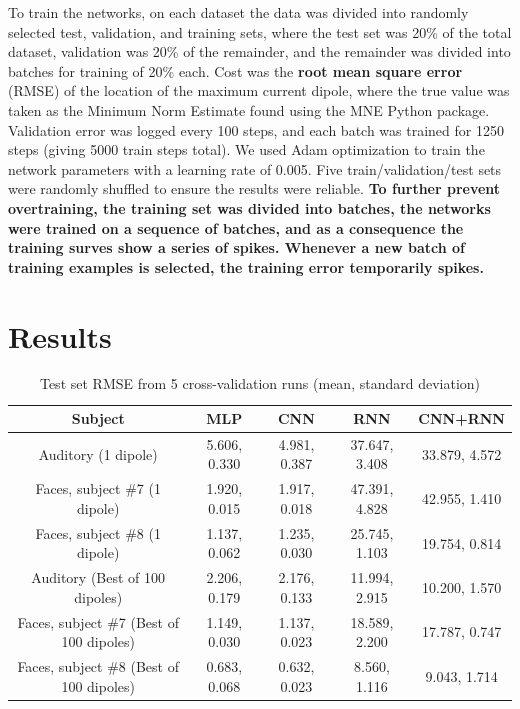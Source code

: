 \documentclass[journal,12pt,onecolumn,draftclsnofoot,]{IEEEtran}
\begin{document}
To train the networks, on each dataset the data was divided into randomly selected test, validation, and training sets, where the test set was 20\% of the total dataset, validation was 20\% of the remainder, and the remainder was divided into batches for training of 20\% each. Cost was the \textbf{root mean square error} (RMSE) of the location of the maximum current dipole, where the true value was taken as the Minimum Norm Estimate found using the MNE Python package. Validation error was logged every 100 steps, and each batch was trained for 1250 steps (giving 5000 train steps total). We used Adam optimization to train the network parameters \cite{kingma2014adam} with a learning rate of 0.005. Five train/validation/test sets were randomly shuffled to ensure the results were reliable. \textbf{To further prevent overtraining, the training set was divided into batches, the networks were trained on a sequence of batches, and as a consequence the training surves show a series of spikes. Whenever a new batch of training examples is selected, the training error temporarily spikes.}

\section{Results}

\begin{table}[h!]
  \centering
  \begin{tabular}{c||c|c|c|c}
    \hline
    Subject & MLP & CNN & RNN & CNN+RNN\\
    \hline
    \hline
    Auditory (1 dipole) & 5.606, 0.330 & 4.981, 0.387 & 37.647, 3.408 & 33.879, 4.572 \\
    \hline
    Faces, subject \#7 (1 dipole) &  1.920, 0.015 & 1.917, 0.018 & 47.391, 4.828 & 42.955, 1.410 \\
    \hline
    Faces, subject \#8 (1 dipole) &  1.137, 0.062 & 1.235, 0.030 & 25.745, 1.103 & 19.754, 0.814 \\
    \hline
    Auditory (Best of 100 dipoles) & 2.206, 0.179 & 2.176, 0.133 & 11.994, 2.915 & 10.200, 1.570 \\
    \hline
    Faces, subject \#7 (Best of 100 dipoles) &  1.149, 0.030 & 1.137, 0.023 & 18.589, 2.200 & 17.787, 0.747 \\
    \hline
    Faces, subject \#8 (Best of 100 dipoles) &  0.683, 0.068 & 0.632, 0.023 & 8.560, 1.116 & 9.043, 1.714 \\
    \hline
  \end{tabular}
  \caption{Test set RMSE from 5 cross-validation runs (mean, standard deviation)}
  \label{tab:results}
\end{table}
\end{document}
